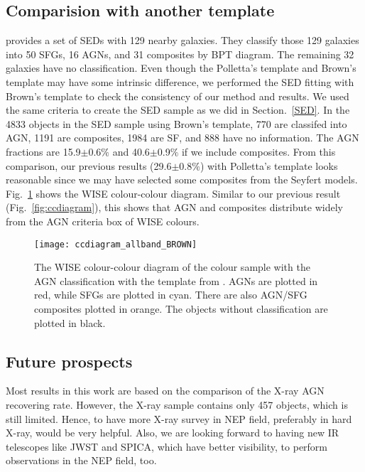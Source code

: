 \documentclass[a4paper,fleqn,usenatbib]{mnras}
\begin{document}
\subsection{Comparision with another template}
\citet{Brown et al. 2014} provides a set of SEDs with 129 nearby galaxies. They classify those 129 galaxies into 50 SFGs, 16 AGNs, and 31 composites by BPT diagram. The remaining 32 galaxies have no classification. Even though the Polletta's template and Brown's template may have some intrinsic difference, we performed the SED fitting with Brown's template to check the consistency of our method and results. We used the same criteria to create the SED sample as we did in Section.~\ref{SED}. In the 4833 objects in the SED sample using Brown's template, 770 are classifed into AGN, 1191 are composites, 1984 are SF, and 888 have no information. The AGN fractions are 15.9$\pm$0.6$\%$ and 40.6$\pm$0.9$\%$ if we include composites. From this comparison, our previous results (29.6$\pm$0.8$\%$) with Polletta's template looks reasonable since we may have selected some composites from the Seyfert models. Fig.~\ref{fig:ccdiagram_BROWN} shows the WISE colour-colour diagram. Similar to our previous result (Fig.~\ref{fig:ccdiagram}), this shows that AGN and composites distribute widely from the AGN criteria box of WISE colours.

\begin{figure}
	\texttt{[image: ccdiagram\_allband\_BROWN]}	
	
    \caption{The WISE colour-colour diagram of the colour sample with the AGN classification with the template from \citet{Brown et al. 2014}. AGNs are plotted in red, while SFGs are plotted in cyan. There are also AGN/SFG composites plotted in orange. The objects without classification are plotted in black.}
    \label{fig:ccdiagram_BROWN}
\end{figure}

\subsection{Future prospects}
Most results in this work are based on the comparison of the X-ray AGN recovering rate. However, the X-ray sample contains only 457 objects, which is still limited. Hence, to have more X-ray survey in NEP field, preferably in hard X-ray, would be very helpful. Also, we are looking forward to having new IR telescopes like JWST and SPICA, which have better visibility, to perform observations in the NEP field, too. 
\end{document}
